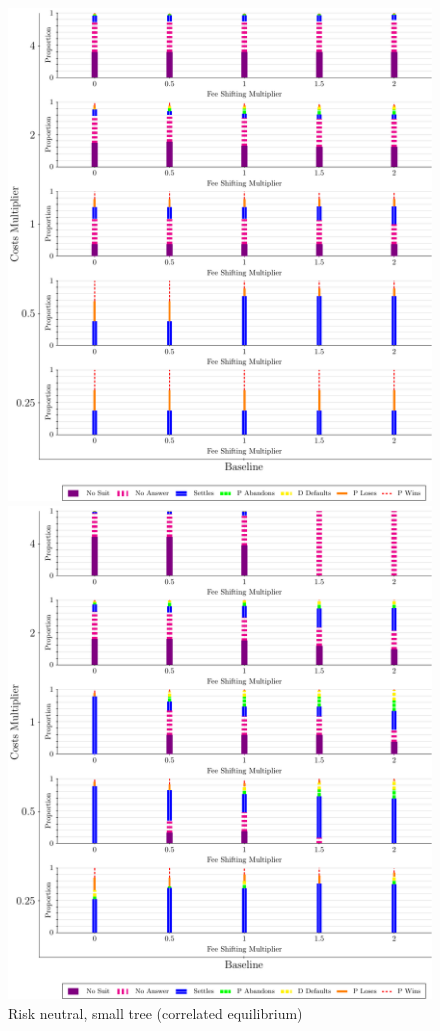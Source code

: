 \documentclass{article}
\begin{document}
\begin{figure}
\begin{minipage}{0.24\textwidth}
		\includegraphics[scale=0.15, trim={0in 0in 0in 0in}, clip]{../Figures/Disposition Baseline (Correlated).pdf}
		\caption{Risk neutral, small tree (correlated equilibrium)}
		\label{fig:treesize_panel2}
    \end{minipage}
   \begin{minipage}{0.24\textwidth}
        \centering
        \includegraphics[scale=0.15, trim={0in 0in 0in 0in}, clip]{../Figures/Disposition (Risk Averse) Baseline.pdf}

\end{minipage}
\end{figure}
\end{document}
